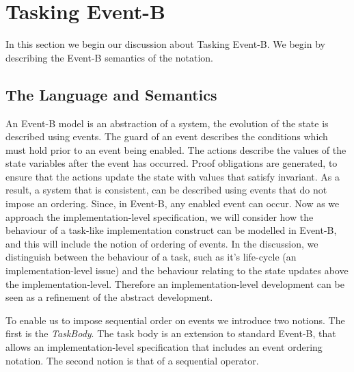 \section{Tasking Event-B}\label{TEB}
In this section we begin our discussion about Tasking Event-B. We begin by describing the Event-B semantics of the notation. 
\subsection{The Language and Semantics}
An Event-B model is an abstraction of a system, the evolution of the state is described using events. The guard of an event describes the conditions which must hold prior to an event being enabled. The actions describe the values of the state variables after the event has occurred. Proof obligations are generated, to ensure that the actions update the state with values that satisfy invariant. As a result, a system that is consistent, can be described using events that do not impose an ordering. Since, in Event-B, any enabled event can occur. Now as we approach the implementation-level specification, we will consider how the behaviour of a task-like implementation construct can be modelled in Event-B, and this will include the notion of ordering of events. In the discussion, we distinguish between the behaviour of a task, such as it's life-cycle (an implementation-level issue) and the behaviour relating to the state updates above the implementation-level. Therefore an implementation-level development can be seen as a refinement of the abstract development.

To enable us to impose sequential order on events we introduce two notions. The first is the \emph{TaskBody}. The task body is an extension to standard Event-B, that allows an implementation-level specification that includes an event ordering notation. The second notion is that of a sequential operator.



